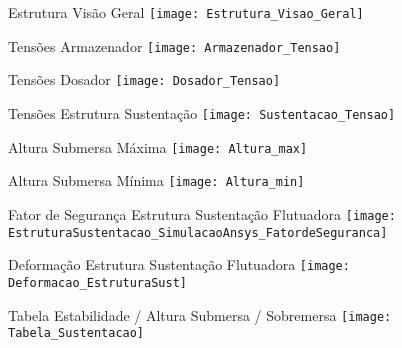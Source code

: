 \begin{figure}
\centering
Estrutura Visão Geral
\texttt{[image: Estrutura\_Visao\_Geral]}
\linebreak
\end{figure}

\begin{figure}
\centering
Tensões Armazenador
\texttt{[image: Armazenador\_Tensao]}
\linebreak
\end{figure}

\begin{figure}
\centering
Tensões Dosador
\texttt{[image: Dosador\_Tensao]}
\linebreak
\end{figure}

\begin{figure}
\centering
Tensões Estrutura Sustentação
\texttt{[image: Sustentacao\_Tensao]}
\linebreak
\end{figure}

\begin{figure}
\centering
Altura Submersa Máxima
\texttt{[image: Altura\_max]}
\linebreak
\end{figure}

\begin{figure}
\centering
Altura Submersa Mínima
\texttt{[image: Altura\_min]}
\linebreak
\end{figure}

\begin{figure}
\centering
Fator de Segurança Estrutura Sustentação Flutuadora
\texttt{[image: EstruturaSustentacao\_SimulacaoAnsys\_FatordeSeguranca]}
\linebreak
\end{figure}

\begin{figure}
\centering
Deformação Estrutura Sustentação Flutuadora
\texttt{[image: Deformacao\_EstruturaSust]}
\linebreak
\end{figure}

\begin{figure}
\centering
Tabela Estabilidade / Altura Submersa / Sobremersa
\texttt{[image: Tabela\_Sustentacao]}
\linebreak
\end{figure}


